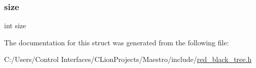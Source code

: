 \mbox{\label{struct___r_b_tree_a439227feff9d7f55384e8780cfc2eb82}} 
\subsubsection{\texorpdfstring{size}{size}}
{\footnotesize\ttfamily int size}



The documentation for this struct was generated from the following file\+:\begin{DoxyCompactItemize}
\item 
C\+:/\+Users/\+Control Interfaces/\+C\+Lion\+Projects/\+Maestro/include/\hyperlink{red__black__tree_8h}{red\+\_\+black\+\_\+tree.\+h}\end{DoxyCompactItemize}
